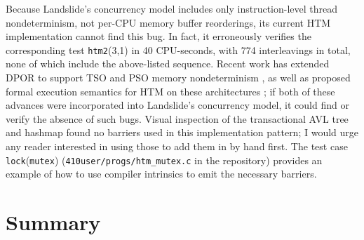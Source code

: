 Because Landslide's concurrency model includes only instruction-level thread nondeterminism,
not per-CPU memory buffer reorderings,
its current HTM implementation cannot find this bug.
In fact, it erroneously verifies the corresponding test {\tt htm2}(3,1)
in 40 CPU-seconds,
with 774 interleavings in total,
none of which include the above-listed sequence.
Recent work has extended DPOR to support TSO and PSO memory nondeterminism \cite{tsopso},
as well as proposed formal execution semantics for HTM on these architectures
\cite{relaxed-transactions-popl,relaxed-transactions-pldi};
if both of these advances were incorporated into Landslide's concurrency model,
it could find or verify the absence of such bugs.
Visual inspection of the transactional AVL tree and hashmap
\cite{tm-benchmark-cmu} found no barriers used in this implementation pattern;
I would urge any reader interested in using those to add them in by hand first.
The test case {\tt lock}({\tt mutex}) ({\tt 410user/progs/htm\_mutex.c} in the repository)
provides an example of how to use compiler intrinsics to emit the necessary barriers.


\section{Summary}

